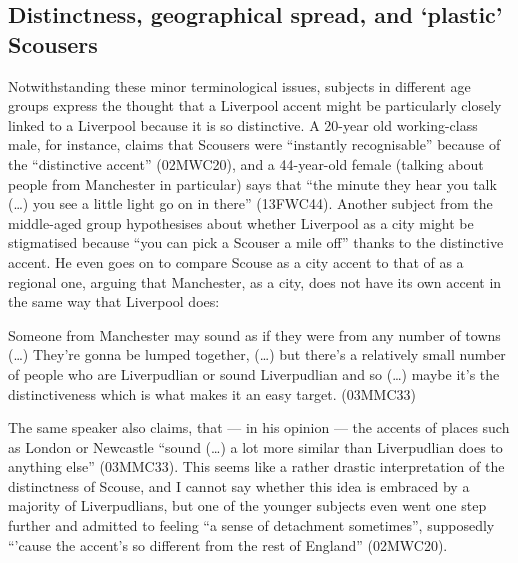 \subsection{Distinctness, geographical spread, and `plastic' Scousers}

Notwithstanding these minor terminological issues, subjects in different age groups express the thought that a Liverpool accent might be particularly closely linked to a Liverpool  because it is so distinctive.
A 20-year old working-class male, for instance, claims that Scousers were ``instantly recognisable'' because of the ``distinctive accent'' (02MWC20), and a 44-year-old female (talking about people from Manchester in particular) says that ``the minute they hear you talk (\ldots) you see a little light go on in there'' (13FWC44).
Another subject from the middle-aged group hypothesises about whether Liverpool as a city might be stigmatised because ``you can pick a Scouser a mile off'' thanks to the distinctive accent.
He even goes on to compare Scouse as a city accent to that of  as a regional one, arguing that Manchester, as a city, does not have its own accent in the same way that Liverpool does:

\begin{example}
	Someone from Manchester may sound as if they were from any number of towns (\ldots) They're gonna be lumped together, (\ldots) but there's a relatively small number of people who are Liverpudlian or sound Liverpudlian and so (\ldots) maybe it's the distinctiveness which is what makes it an easy target. (03MMC33)
\end{example}

The same speaker also claims, that --- in his opinion --- the accents of places such as London or Newcastle ``sound (\ldots) a lot more similar than Liverpudlian does to anything else'' (03MMC33).
This seems like a rather drastic interpretation of the distinctness of Scouse, and I cannot say whether this idea is embraced by a majority of Liverpudlians, but one of the younger subjects even went one step further and admitted to feeling ``a sense of detachment sometimes'', supposedly ``'cause the accent's so different from the rest of England'' (02MWC20).


